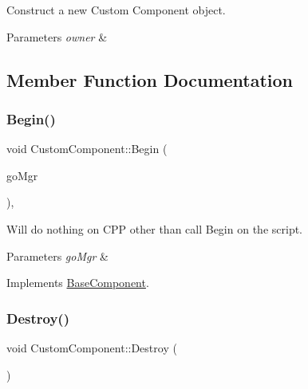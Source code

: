 Construct a new Custom Component object. 


\begin{DoxyParams}{Parameters}
{\em owner} & \\
\hline
\end{DoxyParams}


\subsection{Member Function Documentation}
\mbox{\label{classCustomComponent_a4c2ecd49242b844479cbee2e9385371b}} 
\subsubsection{\texorpdfstring{Begin()}{Begin()}}
{\footnotesize\ttfamily void Custom\+Component\+::\+Begin (\begin{DoxyParamCaption}\item[{\hyperlink{classGameObjectManager}{Game\+Object\+Manager} $\ast$}]{go\+Mgr }\end{DoxyParamCaption})\hspace{0.3cm}{\ttfamily [override]}, {\ttfamily [virtual]}}



Will do nothing on C\+PP other than call Begin on the script. 


\begin{DoxyParams}{Parameters}
{\em go\+Mgr} & \\
\hline
\end{DoxyParams}


Implements \hyperlink{classBaseComponent}{Base\+Component}.

\mbox{\label{classCustomComponent_a938c6db19be64cb1d83da8f9ae7ba4d1}} 
\subsubsection{\texorpdfstring{Destroy()}{Destroy()}}
{\footnotesize\ttfamily void Custom\+Component\+::\+Destroy (\begin{DoxyParamCaption}{ }\end{DoxyParamCaption})}



